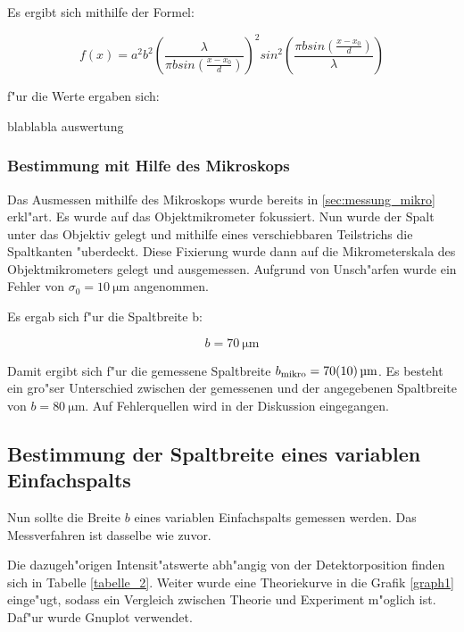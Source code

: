 			Es ergibt sich mithilfe der Formel:

			\begin{equation}
				f(x) = a^2 b^2 \left(\frac{\lambda}{\pi b sin(\frac{x-x_\mathrm{0}}{d})}\right)^2 sin^2 \left( \frac{\pi b sin(\frac{x-x_\mathrm{0}}{d})}{\lambda} \right)
			\end{equation}

			f"ur die Werte ergaben sich:

			
			


			blablabla auswertung

		\subsubsection{Bestimmung mit Hilfe des Mikroskops}
			\label{sub:Bestimmung_mit_Hilfe_des_mikroskops}

			Das Ausmessen mithilfe des Mikroskops wurde bereits in \ref{sec:messung_mikro} erkl"art.
			Es wurde auf das Objektmikrometer fokussiert. Nun wurde der Spalt unter das Objektiv gelegt und mithilfe eines verschiebbaren Teilstrichs die Spaltkanten "uberdeckt. Diese Fixierung wurde dann auf die Mikrometerskala des Objektmikrometers gelegt und ausgemessen.
			Aufgrund von Unsch"arfen wurde ein Fehler von $\sigma_0 = \SI{10}{\micro \meter}$ angenommen.

			Es ergab sich f"ur die Spaltbreite b:

			\begin{equation}
				b = \SI{70}{\micro \meter}
			\end{equation}

			Damit ergibt sich f"ur die gemessene Spaltbreite $b_\mathrm{mikro} = \SI{70 (10)}{\micro \meter}$.
			Es besteht ein gro"ser Unterschied zwischen der gemessenen und der angegebenen Spaltbreite von $b = \SI{80}{\micro \meter}$.
			Auf Fehlerquellen wird in der Diskussion eingegangen.

			\newpage

	\subsection{Bestimmung der Spaltbreite eines variablen Einfachspalts} 
		\label{sub:bestimmung_der_spaltbreite_eines_variablen_einfachspalts}
		
		Nun sollte die Breite $b$ eines variablen Einfachspalts gemessen werden. Das Messverfahren ist dasselbe wie zuvor.

		Die dazugeh"origen Intensit"atswerte abh"angig von der Detektorposition finden sich in Tabelle \ref{tabelle_2}. Weiter wurde eine Theoriekurve in die Grafik \ref{graph1} einge"ugt, sodass ein Vergleich zwischen Theorie und Experiment m"oglich ist. Daf"ur wurde Gnuplot verwendet.

